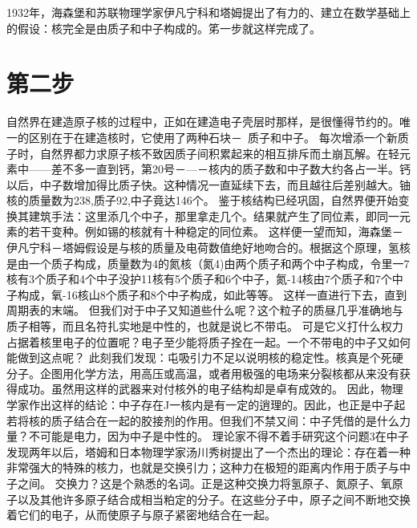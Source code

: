 1932年，海森堡和苏联物理学家伊凡宁科和塔姆提出了有力的、建立在数学基础上的假设：核完全是由质子和中子构成的。笫一步就这样完成了。

\section{第二步}

自然界在建造原子核的过程中，正如在建造电子壳层时那样，是很懂得节约的。唯一的区别在于在建造核时，它使用了两种石块－~质子和中子。
每次增添一个新质子时，自然界都力求原子核不致因质子间积累起来的相互排斥而土崩瓦解。在轻元素中——差不多一直到钙，第20号－—－核内的质子数和中子数大约各占一半。钙以后，中子数增加得比质子快。这种情况一直延续下去，而且越往后差别越大。铀核的质量数为238,质子92,中子竟达146个。
鉴于核结构已经巩固，自然界便开始变换其建筑手法：这里添几个中子，那里拿走几个。结果就产生了同位素，即同一元素的若干变种。例如锡的核就有十种稳定的同位素。
这样便一望而知，海森堡－伊凡宁科－塔姆假设是与核的质量及电荷数值绝好地吻合的。根据这个原理，氢核是由一个质子构成，质量数为4的氮核（氮4)由两个质子和两个中子构成，令里一7核有3个质子和4个中子没护11核有5个质子和6个中子，氮-14核由7个质子和7个中子构成，氧-16核山8个质子和8个中子构成，如此等等。
这样一直进行下去，直到周期表的末端。
但我们对于中子又知道些什么呢？这个粒子的质昼几乎准确地与质子相等，而且名符扎实地是中性的，也就是说匕不带屯。
可是它义打什么权力占据着核里电子的位置呢？电子至少能将质子拴在一起。一个不带电的中子又如何能做到这点呢？
此刻我们发现：屯吸引力不足以说明核的稳定性。核真是个死硬分子。企图用化学方法，用高压或高温，或者用极强的电场来分裂核都从来没有获得成功。虽然用这样的武器来对付核外的电子结构却是卓有成效的。
因此，物理学家作出这样的结论：中子存在J一核内是有一定的逍理的。因此，也正是中子起若将核的质子结合在一起的胶接剂的作用。但我们不禁又间：中子凭借的是什么力量？不可能是电力，因为中子是中性的。
理论家不得不着手研究这个问题3在中子发现两年以后，塔姆和日本物理学家汤川秀树提出了一个杰出的理论：存在着一种非常强大的特殊的核力，也就是交换引力；这种力在极短的距离内作用于质子与中子之间。
交换力？这是个熟悉的名词。正是这种交换力将氢原子、氮原子、氧原子以及其他许多原子结合成相当粕定的分子。在这些分子中，原子之间不断地交换着它们的电子，从而使原子与原子紧密地结合在一起。

